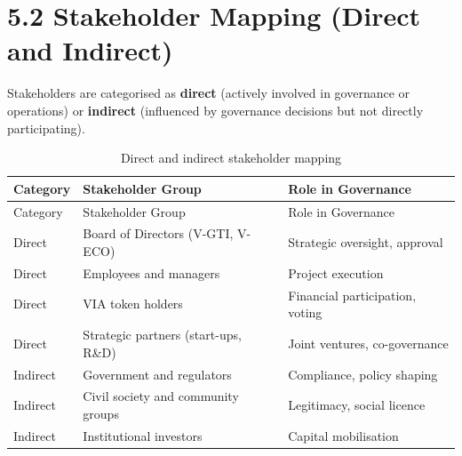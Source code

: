 \documentclass[
  english,
  12pt,
  oneside,
  open=any]{scrbook}
\begin{document}
\section{5.2 Stakeholder Mapping (Direct and Indirect)}\label{sec-map}

Stakeholders are categorised as \textbf{direct} (actively involved in
governance or operations) or \textbf{indirect} (influenced by governance
decisions but not directly participating).

\begin{longtable}[]{@{}
  >{\raggedright\arraybackslash}p{}
  >{\raggedright\arraybackslash}p{}
  >{\raggedright\arraybackslash}p{}@{}}
\caption{Direct and indirect stakeholder
mapping}\label{tbl-stakeholders}\tabularnewline
\toprule\noalign{}
\begin{minipage}[b]{\linewidth}\raggedright
Category
\end{minipage} & \begin{minipage}[b]{\linewidth}\raggedright
Stakeholder Group
\end{minipage} & \begin{minipage}[b]{\linewidth}\raggedright
Role in Governance
\end{minipage} \\
\midrule\noalign{}
\endfirsthead
\toprule\noalign{}
\begin{minipage}[b]{\linewidth}\raggedright
Category
\end{minipage} & \begin{minipage}[b]{\linewidth}\raggedright
Stakeholder Group
\end{minipage} & \begin{minipage}[b]{\linewidth}\raggedright
Role in Governance
\end{minipage} \\
\midrule\noalign{}
\endhead
\bottomrule\noalign{}
\endlastfoot
Direct & Board of Directors (V-GTI, V-ECO) & Strategic oversight,
approval \\
Direct & Employees and managers & Project execution \\
Direct & VIA token holders & Financial participation, voting \\
Direct & Strategic partners (start-ups, R\&D) & Joint ventures,
co-governance \\
Indirect & Government and regulators & Compliance, policy shaping \\
Indirect & Civil society and community groups & Legitimacy, social
licence \\
Indirect & Institutional investors & Capital mobilisation \\
\end{longtable}
\end{document}
